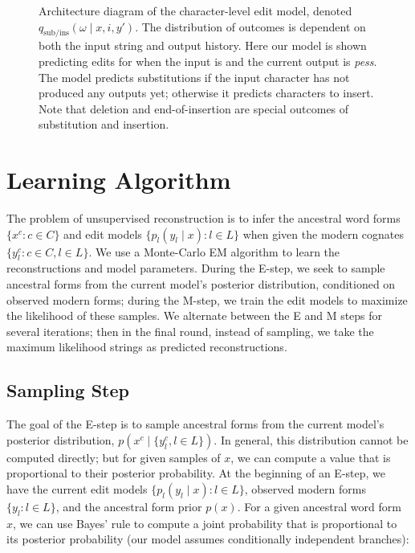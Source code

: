 \documentclass[11pt]{article}
\makeatletter
\def\tikzscale{1}\begin{lrbox}{\measure@tikzpicture}%
\edef\tikzscale{\pgfmathresult}%
\makeatother
\begin{document}
\begin{figure}
\begin{scaletikzpicturetowidth}{0.9\textwidth}
\end{scaletikzpicturetowidth}
\caption{Architecture diagram of the character-level edit model, denoted $q_{\text{sub/ins}}(\omega \mid x, i, y')$. The distribution of outcomes is dependent on both the input string and output history. Here our model is shown predicting edits for \textit{} when the input is \textit{} and the current output is \textit{pess}.  The model predicts substitutions if the input character \textit{} has not produced any outputs yet; otherwise it predicts characters to insert. Note that deletion  and end-of-insertion  are special outcomes of substitution and insertion. }
\label{fig:arch}
\end{figure}

\section{Learning Algorithm}
The problem of unsupervised reconstruction is to infer the ancestral word forms $\{x^c: c\in C\}$ and edit models $\{p_l(y_l\mid x): l \in L\}$ when given the modern cognates $\{y_l^c: c\in C, l\in L\}$. 
We use a Monte-Carlo EM algorithm to learn the reconstructions and model parameters.
During the E-step, we seek to sample ancestral forms from the current model's posterior distribution, conditioned on observed modern forms; during the M-step, we train the edit models to maximize the likelihood of these samples. We alternate between the E and M steps for several iterations; then in the final round, instead of sampling, we take the maximum likelihood strings as predicted reconstructions. 

\subsection{Sampling Step}
The goal of the E-step is to sample ancestral forms from the current model’s posterior distribution, $p(x^c \mid \{y^c_l, l \in L\} )$. In general, this distribution cannot be computed directly; but for given samples of $x$, we can compute a value that is proportional to their posterior probability.  
At the beginning of an E-step, we have the current edit models $\{p_l(y_l\mid x): l\in L\}$, observed modern forms $\{y_l: l\in L\}$, and the ancestral form prior $p(x)$. For a given ancestral word form $x$, we can use Bayes' rule to compute a joint probability that is proportional to its posterior probability (our model assumes conditionally independent branches):
\end{document}
